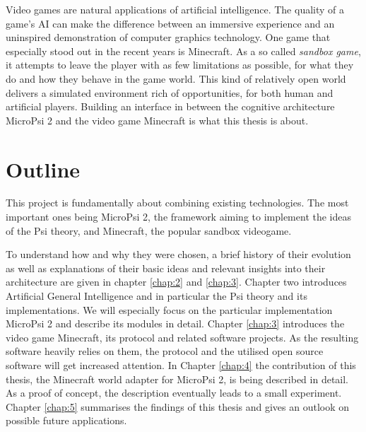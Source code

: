 Video games are natural applications of artificial intelligence. The quality of a game's AI can make the difference between an immersive experience and an uninspired demonstration of computer graphics technology. One game that especially stood out in the recent years is Minecraft. As a so called \emph{sandbox game}, it attempts to leave the player with as few limitations as possible, for what they do and how they behave in the game world. This kind of relatively open world delivers a simulated environment rich of opportunities, for both human and artificial players. Building an interface in between the cognitive architecture MicroPsi 2 and the video game Minecraft is what this thesis is about.


\section{Outline}
This project is fundamentally about combining existing technologies. The most important ones being MicroPsi 2, the framework aiming to implement the ideas of the Psi theory, and Minecraft, the popular sandbox videogame.

To understand how and why they were chosen, a brief history of their evolution as well as explanations of their basic ideas and relevant insights into their architecture are given in chapter \ref{chap:2} and \ref{chap:3}. Chapter two introduces Artificial General Intelligence and in particular the Psi theory and its implementations. We will especially focus on the particular implementation MicroPsi 2 and describe its modules in detail. Chapter \ref{chap:3} introduces the video game Minecraft, its protocol and related software projects. As the resulting software heavily relies on them, the protocol and the utilised open source software will get increased attention. 
In Chapter \ref{chap:4} the contribution of this thesis, the Minecraft world adapter for MicroPsi 2, is being described in detail. As a proof of concept, the description eventually leads to a small experiment.
Chapter \ref{chap:5} summarises the findings of this thesis and gives an outlook on possible future applications.